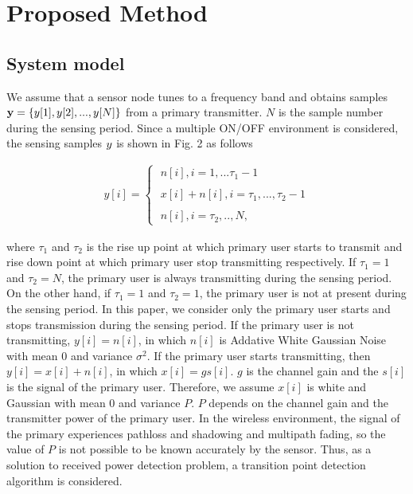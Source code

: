 \chapter[Active Period Detection Method of Primary Signal for Spectrum Database]{Proposed Method}
\label{chapter:Propose}
\section{System model}
\label{system}

We assume that a sensor node tunes to a frequency band and obtains samples ${\bf y}=\left\{y[1],y[2],...,y[N]\right\}$ from a primary transmitter. $N$ is the sample number during the sensing period. Since a multiple ON/OFF environment is considered, the sensing samples ${\boldmath y}$ is shown in Fig. 2 as follows

\begin{eqnarray}
y[i] = 
\begin{cases}
\;n[i],    i=1,...\tau_1-1 \\ \nonumber
\; \\ \nonumber
\;x[i]+n[i], i=\tau_1,...,\tau_2-1 \\
\; \\ \nonumber
\;n[i],    i=\tau_2,..,N,
\end{cases}
\end{eqnarray}

where $\tau_1$ and $\tau_2$ is the rise up point at which primary user starts to transmit and rise down point at which primary user stop transmitting respectively. If $\tau_1=1$ and $\tau_2=N$, the primary user is always transmitting during the sensing period. On the other hand, if $\tau_1=1$ and $\tau_2=1$, the primary user is not at present during the sensing period. In this paper, we consider only the primary user starts and stops transmission during the sensing period.
If the primary user is not transmitting, $y[i] = n[i]$, in which $n[i]$ is Addative White Gaussian Noise with mean 0 and variance $\sigma^2$. If the primary user starts transmitting, then $y[i] = x[i] + n[i]$, in which $x[i] = gs[i]$. $g$ is the channel gain and the $s[i]$ is the signal of the primary user. Therefore, we assume $x[i]$ is white and Gaussian with mean 0 and variance $P$. $P$ depends on the channel gain and the transmitter power of the primary user. In the wireless environment, the signal of the primary experiences pathloss and shadowing and  multipath fading, so the value of $P$ is not possible to be known accurately by the sensor. Thus, as a solution to received power detection problem, a transition point detection algorithm is considered. 

